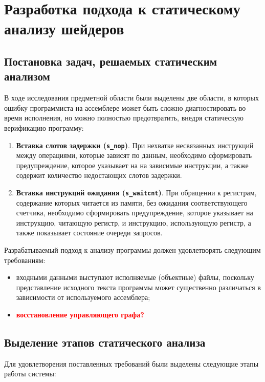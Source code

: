 \documentclass[a4paper,14pt]{extarticle}
\newcommand{\todo}[1]{\textbf{\textcolor{red}{#1}}}
\newenvironment{ul}{\begin{itemize}[noitemsep,topsep=0em]}{\end{itemize}\vspace{20pt}}
\newenvironment{ol}{\begin{enumerate}[noitemsep,topsep=0em]}{\end{enumerate}\vspace{20pt}}
\begin{document}
\section{Разработка подхода к статическому анализу шейдеров}

\subsection{Постановка задач, решаемых статическим анализом}

В ходе исследования предметной области были выделены две области, в которых ошибку программиста
на ассемблере может быть сложно диагностировать во время исполнения, но можно полностью
предотвратить, внедря статическую верификацию программу:
\begin{ol}
\item \textbf{Вставка слотов задержки (\texttt{s\_nop})}. При нехватке несвязанных инструкций между операциями, которые зависят по данным, необходимо сформировать предупреждение, которое указывает на
на зависимые инструкции, а также содержит количество недостающих слотов задержки.
\item \textbf{Вставка инструкций ожидания (\texttt{s\_waitcnt})}. При обращении к регистрам, содержание которых читается из памяти, без ожидания соответствующего счетчика, необходимо сформировать предупреждение, которое указывает на инструкцию, читающую регистр, и инструкцию, использующую регистр, а также показывает состояние очереди запросов.
\end{ol}

Разрабатываемый подход к анализу программы должен удовлетворять следующим требованиям:

\begin{ul}
\item входными данными выступают исполняемые (объектные) файлы, поскольку представление исходного текста программы может существенно различаться в зависимости от используемого ассемблера;
\item \todo{восстановление управляющего графа?}
\end{ul}

\subsection{Выделение этапов статического анализа}

Для удовлетворения поставленных требований были выделены следующие этапы работы системы:\\
\end{document}
